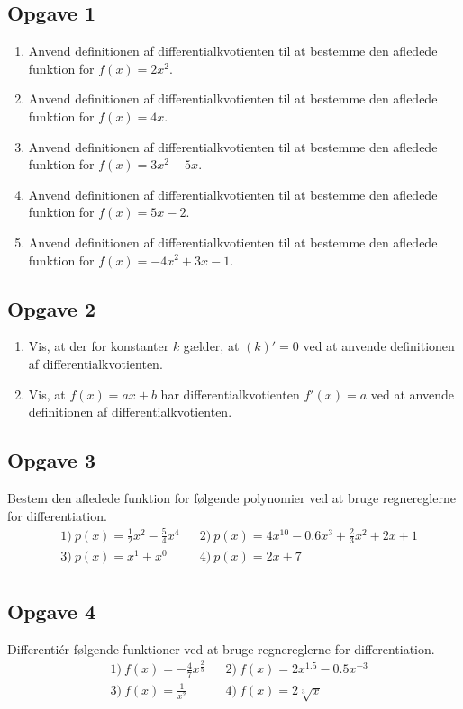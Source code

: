 \subsection*{Opgave 1}
\begin{enumerate}[label=\roman*)]
	\item Anvend definitionen af differentialkvotienten til at bestemme den afledede funktion for $f(x) = 2x^2$.
	\item Anvend definitionen af differentialkvotienten til at bestemme den afledede funktion for $f(x) = 4x$.
	\item Anvend definitionen af differentialkvotienten til at bestemme den afledede funktion for $f(x) = 3x^2 - 5x$.
	\item Anvend definitionen af differentialkvotienten til at bestemme den afledede funktion for $f(x) = 5x - 2$.
	\item Anvend definitionen af differentialkvotienten til at bestemme den afledede funktion for $f(x) = -4x^2 + 3x - 1$.
\end{enumerate}

\subsection*{Opgave 2}
\begin{enumerate}[label=\roman*)]
	\item Vis, at der for konstanter $k$ gælder, at $(k)' = 0$ ved at anvende definitionen af differentialkvotienten.	
	\item Vis, at $f(x) = ax + b$ har differentialkvotienten $f'(x) = a$ ved at anvende definitionen af differentialkvotienten.
\end{enumerate}


\subsection*{Opgave 3}
Bestem den afledede funktion for følgende polynomier ved at bruge regnereglerne for differentiation.
\begin{align*}
	&1) \ p(x) = \frac{1}{2}x^2 -\frac{5}{4}x^4   &&2) \ p(x) = 4x^{10} - 0.6x^{3}+\frac{2}{3}x^{2}+2x+1\\
	&3) \ p(x) = x^{1} + x^0  &&4) \ p(x) = 2x + 7     \\ 
\end{align*}

\subsection*{Opgave 4}
Differentiér følgende funktioner ved at bruge regnereglerne for differentiation.
\begin{align*}
	&1) \ f(x) = -\frac{4}{7}x^{\frac{2}{5}}   &&2) \ f(x) = 2x^{1.5}-0.5x^{-3}\\
	&3) \ f(x) = \frac{1}{x^2}  &&4) \ f(x) = 2\sqrt[3]{x}     \\ 
\end{align*}


